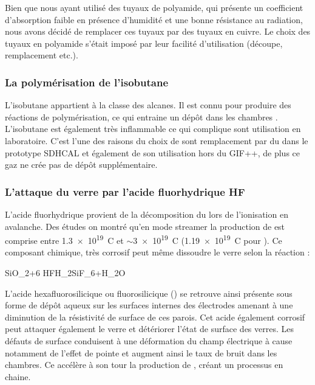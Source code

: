Bien que nous ayant utilisé des tuyaux de polyamide, qui présente un coefficient d'absorption faible en présence d'humidité et une bonne résistance au radiation, nous avons décidé de remplacer ces tuyaux par des tuyaux en cuivre. Le choix des tuyaux en polyamide s'était imposé par leur facilité d'utilisation (découpe, remplacement etc.). 

\subsubsection{La polymérisation de l'isobutane}
 L'isobutane  appartient à la classe des alcanes. Il est connu pour produire des réactions de polymérisation, ce qui entraine un dépôt dans les chambres \cite{na60}. L'isobutane est également très inflammable ce qui complique sont utilisation en laboratoire. C'est l'une des raisons du choix de sont remplacement par du  dans le prototype SDHCAL et également de son utilisation hors du GIF++, de plus ce gaz ne crée pas de dépôt supplémentaire.

\subsubsection{L'attaque du verre par l'acide fluorhydrique HF}
L'acide fluorhydrique  provient de la décomposition du  lors de l'ionisation en avalanche. Des études on montré qu'en mode streamer la production de  est comprise entre \num{1.3e19}\si{\per\coulomb} \cite{Aielli:2006ih} et $\sim$\num{3e19}\si{\per\coulomb} \cite{Abbrescia:2006hk} (\num{1.19e19}\si{\per\coulomb} pour \cite{Lu:2009zzd}). Ce composant chimique, très corrosif peut même dissoudre le verre selon la réaction :
\begin{chemeqn}
SiO_2+6 HF\longrightarrow H_2SiF_6+H_2O
\end{chemeqn}
L'acide hexafluorosilicique ou fluorosilicique () se retrouve ainsi présente sous forme de dépôt aqueux sur les surfaces internes des électrodes amenant à une diminution de la résistivité de surface de ces parois. Cet acide également corrosif peut attaquer également le verre et détériorer l'état de surface des verres. Les défauts de surface conduisent à une déformation du champ électrique à cause notamment de l'effet de pointe et augment ainsi le taux de bruit dans les chambres. Ce accélère à son tour la production de , créant un processus en chaine.

